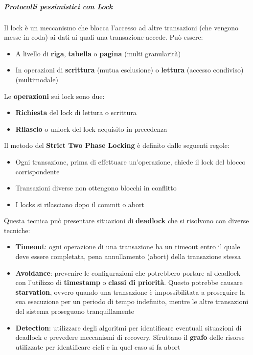 \subparagraph{Protocolli pessimistici con Lock}
Il lock è un meccanismo che blocca l'accesso ad altre transazioni (che vengono messe in coda) ai dati ai quali una transazione accede. Può essere:
\begin{itemize}
	\item A livello di \textbf{riga}, \textbf{tabella} o \textbf{pagina} (multi granularità)
	\item In operazioni di \textbf{scrittura} (mutua esclusione) o \textbf{lettura} (accesso condiviso) (multimodale)
\end{itemize}
Le \textbf{operazioni} sui lock sono due:
\begin{itemize}
	\item \textbf{Richiesta} del lock di lettura o scrittura
	\item \textbf{Rilascio} o unlock del lock acquisito in precedenza
\end{itemize}

Il metodo del \textbf{Strict Two Phase Locking} è definito dalle seguenti regole:
\begin{itemize}
	\item Ogni transazione, prima di effettuare un'operazione, chiede il lock del blocco corrispondente
	\item Transazioni diverse non ottengono blocchi in conflitto
	\item I locks si rilasciano dopo il commit o abort
\end{itemize}
Questa tecnica può presentare situazioni di \textbf{deadlock} che si risolvono con diverse tecniche:
\begin{itemize}
	\item \textbf{Timeout}: ogni operazione di una transazione ha un timeout entro il quale deve essere completata, pena annullamento (abort) della transazione stessa
	\item \textbf{Avoidance}: prevenire le configurazioni che potrebbero portare al deadlock con l'utilizzo di \textbf{timestamp} o \textbf{classi di priorità}. Questo potrebbe causare \textbf{starvation}, ovvero quando una transazione è impossibilitata a proseguire la sua esecuzione per un periodo di tempo indefinito, mentre le altre transazioni del sistema proseguono tranquillamente
	\item \textbf{Detection}: utilizzare degli algoritmi per identificare eventuali situazioni di deadlock e prevedere meccanismi di recovery. Sfruttano il \textbf{grafo} delle risorse utilizzate per identificare cicli e in quel caso si fa abort
\end{itemize}

